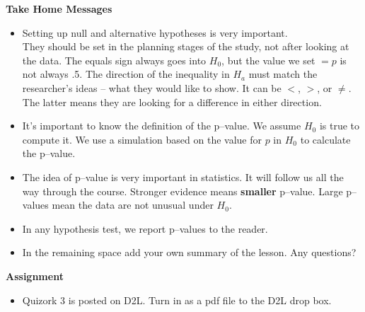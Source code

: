 {\bf Take Home Messages}
\begin{itemize}
  \item Setting up null and alternative hypotheses is very
    important.\\
    They should be set in the planning stages of the study, not after
    looking at the data. 
    The equals sign always goes into $H_0$, but the value we set $ = p$ is not
    always .5.  The direction of the inequality in $H_a$ must match
    the researcher's ideas -- what they would like to show. It can be
    $<$, $>$, or $\neq$.  The latter means they are looking for a
    difference in either direction.
  \item It's important to know the definition of the p--value. We
    assume $H_0$ is true to compute it.  We  use a simulation based
    on the  value for $p$  in $H_0$ to calculate the p--value.    
  \item The idea of p--value is very important in statistics. It will
    follow us all the way through the course. Stronger evidence means
    {\bf smaller} p--value.  Large p--values mean the data are not
    unusual under $H_0$.
  \item In any hypothesis test, we report p--values to the reader.  
 \item 
  In the remaining space add your own summary of the lesson. Any questions?
\end{itemize}\vfill

{\bf Assignment}
\begin{itemize}
\item Quizork 3 is posted on D2L.  Turn in as a pdf file to the D2L
  drop box.
\end{itemize}




